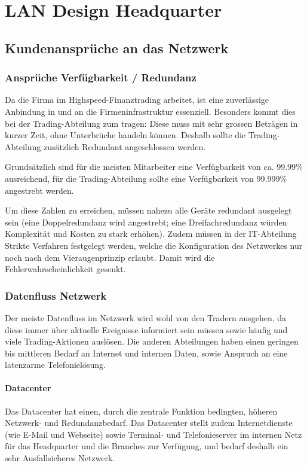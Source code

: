 \section{LAN Design Headquarter}

\subsection{Kundenansprüche an das Netzwerk}

\subsubsection{Ansprüche Verfügbarkeit / Redundanz }
Da die Firma im Highspeed-Finanztrading arbeitet, ist eine zuverlässige Anbindung in und an die Firmeninfrastruktur essenziell. Besonders kommt dies bei der Trading-Abteilung zum tragen: Diese muss mit sehr grossen Beträgen in kurzer Zeit, ohne Unterbrüche handeln können. Deshalb sollte die Trading-Abteilung zusätzlich Redundant angeschlossen werden.

Grundsätzlich sind für die meisten Mitarbeiter eine Verfügbarkeit von ca. 99.99\% ausreichend, für die Trading-Abteilung sollte eine Verfügbarkeit von 99.999\% angestrebt werden.

Um diese Zahlen zu erreichen, müssen nahezu alle Geräte redundant ausgelegt sein (eine Doppelredundanz wird angestrebt; eine Dreifachredundanz würden Komplexität und Kosten zu stark erhöhen). Zudem müssen in der IT-Abteilung Strikte Verfahren festgelegt werden, welche die Konfiguration des Netzwerkes nur noch nach dem Vieraugenprinzip erlaubt. Damit wird die Fehlerwahrscheinlichkeit gesenkt.

\subsubsection{Datenfluss Netzwerk}

Der meiste Datenfluss im Netzwerk wird wohl von den Tradern ausgehen, da diese immer über aktuelle Ereignisse informiert sein müssen sowie häufig und viele Trading-Aktionen auslösen. Die anderen Abteilungen haben einen geringen bis mittleren Bedarf an Internet und internen Daten, sowie Anspruch an eine latenzarme Telefonielösung.

\paragraph{Datacenter}
Das Datacenter hat einen, durch die zentrale Funktion bedingten, höheren Netzwerk- und Redundanzbedarf. Das Datacenter stellt zudem Internetdienste (wie E-Mail und Webseite) sowie Terminal- und Telefonieserver im internen Netz für das Headquarter und die Branches zur Verfügung, und bedarf deshalb ein sehr Ausfallsicheres Netzwerk.

